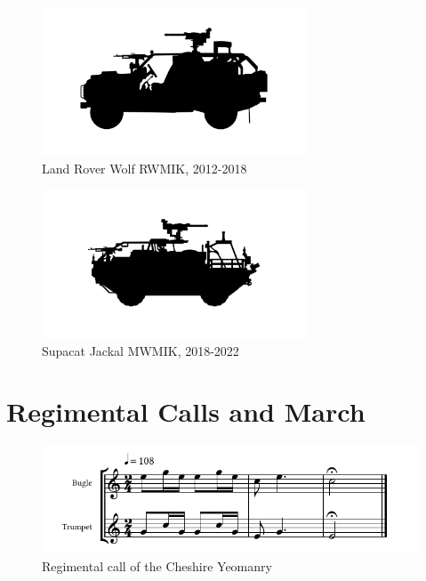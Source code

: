 \begin{figure}[h]
  \centering
  \includegraphics[width=0.7\textwidth]{platforms/wmik.pdf}
  \caption*{Land Rover Wolf RWMIK, 2012-2018}
\end{figure}

\begin{figure}[h]
  \centering
  \includegraphics[width=0.7\textwidth]{platforms/jackal.pdf}
  \caption*{Supacat Jackal MWMIK, 2018-2022}
\end{figure}

\chapter{Regimental Calls and March}

\begin{figure}[h]
  \centering
  \includegraphics[width=\textwidth]{gazette/cheshire-yeomanry-call.pdf}
  \caption*{Regimental call of the Cheshire Yeomanry~\cite[p11]{trumpet-and-bugle-calls}}
\end{figure}

\vspace{10mm}

